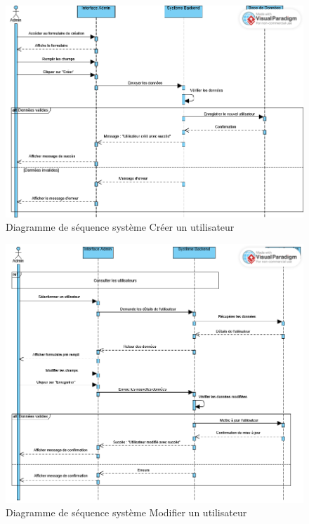 \begin{figure}[H]
    \centering
    \includegraphics[width=1\linewidth]{projet/images/diagramme de sequance/cree utilisateur admin sequance diagram.png}
    \caption{Diagramme de séquence système Créer un utilisateur}
    \label{fig:diagramme2}
\end{figure}

\begin{figure}[H]
    \centering
    \includegraphics[width=1\linewidth]{projet/images/diagramme de sequance/modifier utlisateur admin sequance diagram.png}
    \caption{Diagramme de séquence système Modifier un utilisateur}
    \label{fig:diagramme3}
\end{figure}

